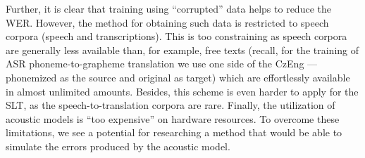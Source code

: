 Further, it is clear that training using ``corrupted'' data helps to reduce the WER. However, the method for obtaining such data is restricted to speech corpora (speech and transcriptions). This is too constraining as speech corpora are generally less available than, for example, free texts (recall, for the training of ASR phoneme-to-grapheme translation we use one side of the CzEng --- phonemized as the source and original as target) which are effortlessly available in almost unlimited amounts. Besides, this scheme is even harder to apply for the SLT, as the speech-to-translation corpora are rare. Finally, the utilization of acoustic models is ``too expensive'' on hardware resources. To overcome these limitations, we see a potential for researching a method that would be able to simulate the errors produced by the acoustic model.


